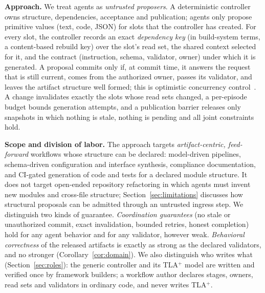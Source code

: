 \textbf{Approach.} We treat agents as \emph{untrusted proposers}. A deterministic controller owns structure, dependencies, acceptance and publication; agents only propose primitive values (text, code, JSON) for slots that the controller has created. For every slot, the controller records an exact \emph{dependency key} (in build-system terms, a content-based rebuild key) over the slot's read set, the shared context selected for it, and the contract (instruction, schema, validator, owner) under which it is generated. A proposal commits only if, at commit time, it answers the request that is still current, comes from the authorized owner, passes its validator, and leaves the artifact structure well formed; this is optimistic concurrency control~\cite{occ}. A change invalidates exactly the slots whose read sets changed, a per-episode budget bounds generation attempts, and a publication barrier releases only snapshots in which nothing is stale, nothing is pending and all joint constraints hold.

\textbf{Scope and division of labor.} The approach targets \emph{artifact-centric, feed-forward} workflows whose structure can be declared: model-driven pipelines, schema-driven configuration and interface synthesis, compliance documentation, and CI-gated generation of code and tests for a declared module structure. It does not target open-ended repository refactoring in which agents must invent new modules and cross-file structure; Section~\ref{sec:limitations} discusses how structural proposals can be admitted through an untrusted ingress step. We distinguish two kinds of guarantee. \emph{Coordination guarantees} (no stale or unauthorized commit, exact invalidation, bounded retries, honest completion) hold for any agent behavior and for any validator, however weak. \emph{Behavioral correctness} of the released artifacts is exactly as strong as the declared validators, and no stronger (Corollary~\ref{cor:domain}). We also distinguish who writes what (Section~\ref{sec:roles}): the generic controller and its TLA$^+$ model are written and verified once by framework builders; a workflow author declares stages, owners, read sets and validators in ordinary code, and never writes TLA$^+$.

